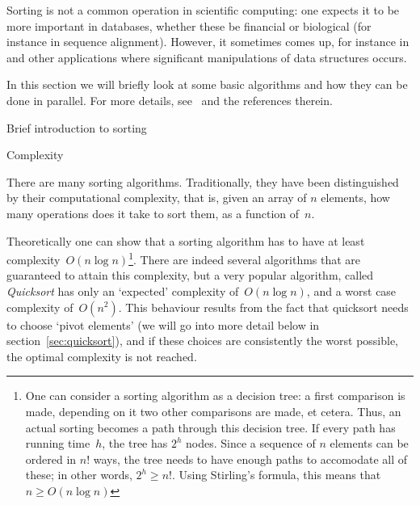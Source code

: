 

\label{sec:sorting}

Sorting is not a common operation in scientific computing: one expects
it to be more important in databases, whether these be financial or
biological (for instance in sequence alignment). However, it sometimes
comes up, for instance in  and other applications where
significant manipulations of data structures occurs.

In this section we will briefly look at some basic 
algorithms and how they can be done in parallel. For more details,
see~\cite{Kumar:parcomp-book} and the references therein.

 {Brief introduction to sorting}

 {Complexity}

There are many sorting algorithms. Traditionally, they have 
been distinguished by
their computational complexity, that is, given an array of $n$
elements, how many operations does it take to sort them, as a function
of~$n$. 

Theoretically one can show that a sorting algorithm has to have at
least complexity~$O(n\log n)$\footnote{One can consider a sorting
  algorithm as a decision tree: a first comparison is made, depending
  on it two other comparisons are made, et cetera. Thus, an actual
  sorting becomes a path through this decision tree. If every path has
  running time~$h$, the tree has $2^h$ nodes. Since a sequence of $n$
  elements can be ordered in $n!$ ways, the tree needs to have enough
  paths to accomodate all of these; in other words, $2^h\geq
  n!$. Using Stirling's formula, this means that $n\geq O(n\log
  n)$}. There are indeed several algorithms that are guaranteed to
attain this complexity, but a very popular algorithm, called
\emph{Quicksort} has only an
`expected' complexity of~$O(n\log n)$, and a worst case complexity
of~$O(n^2)$. This behaviour results from the fact that quicksort needs
to choose `pivot elements' (we will go into more detail below in
section~\ref{sec:quicksort}), and if these choices are consistently
the worst possible, the optimal complexity is not reached.

